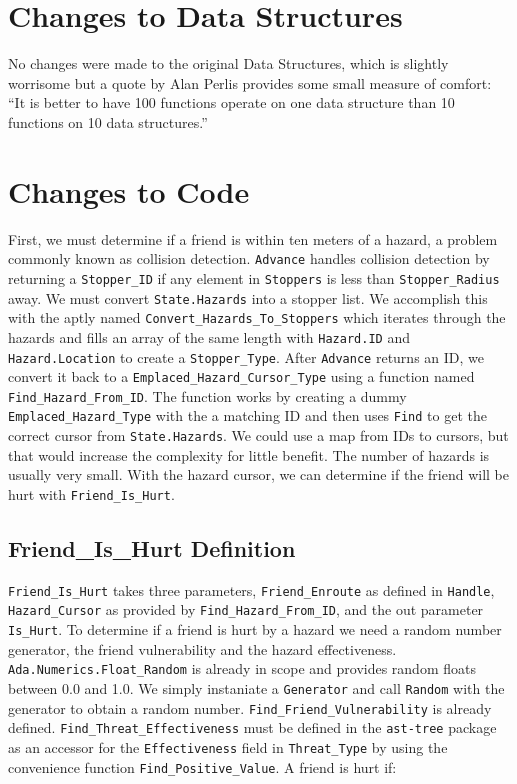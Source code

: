 \documentclass[12pt,letterpaper,titlepage]{article}
\newcommand{\code}[1]{\texttt{#1}}
\begin{document}
\clearpage

\section{Changes to Data Structures}

No changes were made to the original Data Structures, which is
slightly worrisome but a quote by Alan Perlis provides some small
measure of comfort: ``It is better to have 100 functions operate on
one data structure than 10 functions on 10 data structures.''


\section{Changes to Code}
First, we must determine if a friend is within ten meters of a hazard,
a problem commonly known as collision detection.  \code{Advance}
handles collision detection by returning a \code{Stopper_ID} if any
element in \code{Stoppers} is less than \code{Stopper_Radius} away.
We must convert \code{State.Hazards} into a stopper list.  We
accomplish this with the aptly named
\code{Convert_Hazards_To_Stoppers} which iterates through the hazards
and fills an array of the same length with \code{Hazard.ID} and
\code{Hazard.Location} to create a \code{Stopper_Type}.  After
\code{Advance} returns an ID, we convert it back to a
\code{Emplaced_Hazard_Cursor_Type} using a function named
\code{Find_Hazard_From_ID}.  The function works by creating a dummy
\code{Emplaced_Hazard_Type} with the a matching ID and then uses
\code{Find} to get the correct cursor from \code{State.Hazards}.  We
could use a map from IDs to cursors, but that would increase the
complexity for little benefit.  The number of hazards is usually very
small.  With the hazard cursor, we can determine if the friend will be
hurt with \code{Friend_Is_Hurt}.

\subsection{Friend_Is_Hurt Definition}
\code{Friend_Is_Hurt} takes three parameters, \code{Friend_Enroute} as
defined in \code{Handle}, \code{Hazard_Cursor} as provided by
\code{Find_Hazard_From_ID}, and the out parameter \code{Is_Hurt}. To
determine if a friend is hurt by a hazard we need a random number
generator, the friend vulnerability and the hazard effectiveness.
\code{Ada.Numerics.Float_Random} is already in scope and provides
random floats between 0.0 and 1.0.  We simply instaniate a
\code{Generator} and call \code{Random} with the generator to obtain a
random number. \code{Find_Friend_Vulnerability} is already defined.
\code{Find_Threat_Effectiveness} must be defined in the
\code{ast-tree} package as an accessor for the \code{Effectiveness}
field in \code{Threat_Type} by using the convenience function
\code{Find_Positive_Value}.  A friend is hurt if:
\end{document}

